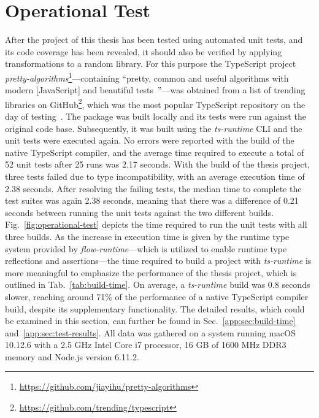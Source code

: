 \section{Operational Test}
\label{sec:operational-test}

After the project of this thesis has been tested using automated unit tests, and its code coverage has been revealed, it should also be verified by applying transformations to a random library. For this purpose the TypeScript project \emph{pretty-algorithms}\footnote{\url{https://github.com/jiayihu/pretty-algorithms}}---containing ``pretty, common and useful algorithms with modern [JavaScript] and beautiful tests~\cite{Evaluation:pretty-algorithms}''---was obtained from a list of trending libraries on GitHub\footnote{\url{https://github.com/trending/typescript}}, which was the most popular TypeScript repository on the day of testing~\cite{GitHub:Trending:Archive}. The package was built locally and its tests were run against the original code base. Subsequently, it was built using the \emph{ts-runtime} CLI and the unit tests were executed again. No errors were reported with the build of the native TypeScript compiler, and the average time required to execute a total of 52 unit tests after 25 runs was 2.17 seconds. With the build of the thesis project, three tests failed due to type incompatibility, with an average execution time of 2.38 seconds. After resolving the failing tests, the median time to complete the test suites was again 2.38 seconds, meaning that there was a difference of 0.21 seconds between running the unit tests against the two different builds. Fig.~\ref{fig:operational-test} depicts the time required to run the unit tests with all three builds.
As the increase in execution time is given by the runtime type system provided by \emph{flow-runtime}---which is utilized to enable runtime type reflections and assertions---the time required to build a project with \emph{ts-runtime} is more meaningful to emphasize the performance of the thesis project, which is outlined in Tab.~\ref{tab:build-time}. On average, a \emph{ts-runtime} build was 0.8 seconds slower, reaching around 71\% of the performance of a native TypeScript compiler build, despite its supplementary functionality.
The detailed results, which could be examined in this section, can further be found in Sec.~\ref{app:sec:build-time} and~\ref{app:sec:test-results}. All data was gathered on a system running macOS 10.12.6 with a 2.5 GHz Intel Core i7 processor, 16 GB of 1600 MHz DDR3 memory and Node.js version 6.11.2.

